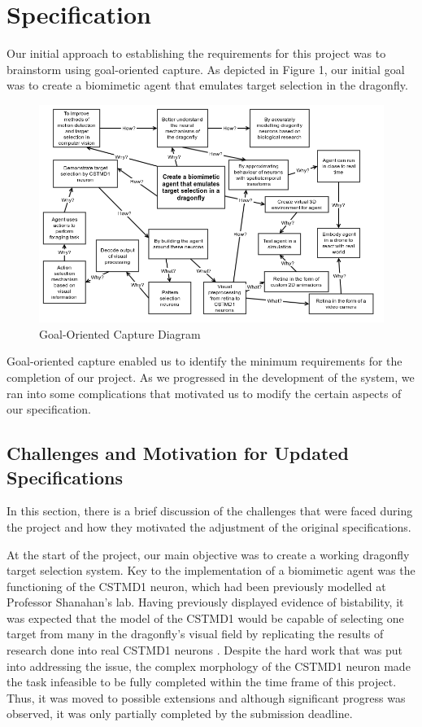 \documentclass[a4paper,11pt]{article}
\begin{document}
\section{Specification}

Our initial approach to establishing the requirements for this project was to brainstorm using goal-oriented capture. As depicted in Figure 1, our initial goal was to create a biomimetic agent that emulates target selection in the dragonfly. 
	
	\begin{figure}[h]
	\begin{center}
	\includegraphics[scale = 0.5]{goalorient}
	\end{center}
	\caption{Goal-Oriented Capture Diagram}
	\end{figure}	
	
	Goal-oriented capture enabled us to identify the minimum requirements for the completion of our project. As we progressed in the development of the system, we ran into some complications that motivated us to modify the certain aspects of our specification. 
\subsection{Challenges and Motivation for Updated Specifications}
In this section, there is a brief discussion of the challenges that were faced during the project and how they motivated the adjustment of the original specifications.

	At the start of the project, our main objective was to create a working dragonfly target selection system. Key to the implementation of a biomimetic agent was the functioning of the CSTMD1 neuron, which had been previously modelled at Professor Shanahan's lab. Having previously displayed evidence of bistability, it was expected that the model of the CSTMD1 would be capable of selecting one target from many in the dragonfly's visual field by replicating the results of research done into real CSTMD1 neurons \cite{w13}. Despite the hard work that was put into addressing the issue, the complex morphology of the CSTMD1 neuron made the task infeasible to be fully completed within the time frame of this project. Thus, it was moved to possible extensions and although significant progress was observed, it was only partially completed by the submission deadline.
	
\end{document}
